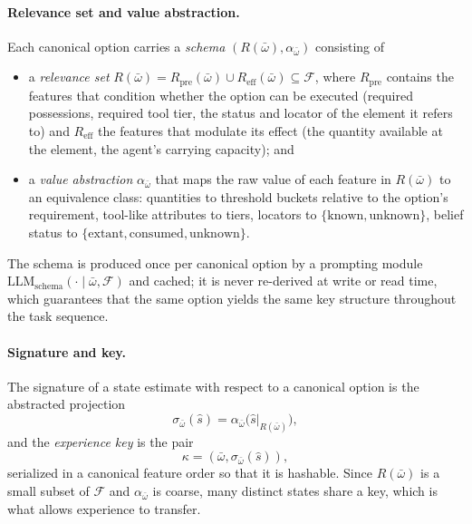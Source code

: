 \documentclass[11pt]{article}
\newcommand{\llm}[1]{\mathrm{LLM}_{\mathrm{#1}}}
\newcommand{\calF}{\mathcal{F}}
\newcommand{\Rel}{R}
\newcommand{\shat}{\hat{s}}
\begin{document}
\paragraph{Relevance set and value abstraction.}
Each canonical option carries a \emph{schema} $(\Rel(\bar\omega),\alpha_{\bar\omega})$ consisting of
\begin{itemize}[leftmargin=1.5em,itemsep=1pt]
\item a \emph{relevance set} $\Rel(\bar\omega)=\Rel_{\mathrm{pre}}(\bar\omega)\cup\Rel_{\mathrm{eff}}(\bar\omega)\subseteq\calF$, where $\Rel_{\mathrm{pre}}$ contains the features that condition whether the option can be executed (required possessions, required tool tier, the status and locator of the element it refers to) and $\Rel_{\mathrm{eff}}$ the features that modulate its effect (the quantity available at the element, the agent's carrying capacity); and
\item a \emph{value abstraction} $\alpha_{\bar\omega}$ that maps the raw value of each feature in $\Rel(\bar\omega)$ to an equivalence class: quantities to threshold buckets relative to the option's requirement, tool-like attributes to tiers, locators to $\{\mathrm{known},\mathrm{unknown}\}$, belief status to $\{\mathrm{extant},\mathrm{consumed},\mathrm{unknown}\}$.
\end{itemize}
The schema is produced once per canonical option by a prompting module $\llm{schema}(\cdot\mid\bar\omega,\calF)$ and cached; it is never re-derived at write or read time, which guarantees that the same option yields the same key structure throughout the task sequence.

\paragraph{Signature and key.}
The signature of a state estimate with respect to a canonical option is the abstracted projection
\begin{equation}
\sigma_{\bar\omega}(\shat)=\alpha_{\bar\omega}\big(\shat|_{\Rel(\bar\omega)}\big),
\label{eq:signature}
\end{equation}
and the \emph{experience key} is the pair
\begin{equation}
\kappa=(\bar\omega,\sigma_{\bar\omega}(\shat)),
\label{eq:key}
\end{equation}
serialized in a canonical feature order so that it is hashable. Since $\Rel(\bar\omega)$ is a small subset of $\calF$ and $\alpha_{\bar\omega}$ is coarse, many distinct states share a key, which is what allows experience to transfer.
\end{document}
